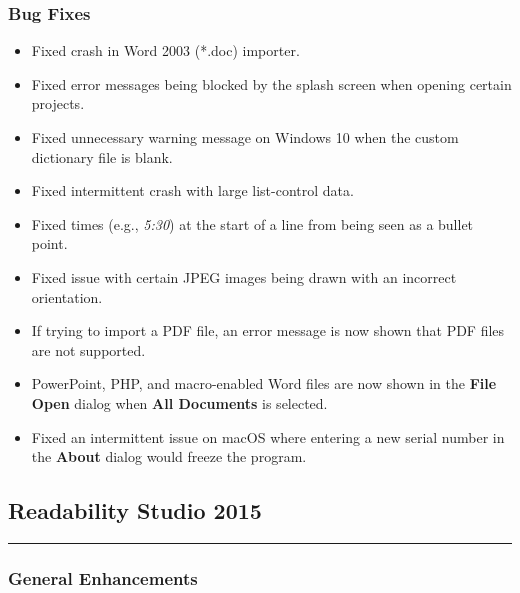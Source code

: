 \documentclass[
]{book}
\providecommand{\tightlist}{%
  \setlength{\itemsep}{0pt}\setlength{\parskip}{0pt}}
\theoremstyle{definition}
\theoremstyle{definition}
\theoremstyle{definition}
\theoremstyle{definition}
\theoremstyle{remark}
\begin{document}
\hypertarget{bug-fixes-1}{%
\subsubsection*{Bug Fixes}\label{bug-fixes-1}}

\begin{itemize}
\tightlist
\item
  Fixed crash in Word 2003 (*.doc) importer.
\item
  Fixed error messages being blocked by the splash screen when opening certain projects.
\item
  Fixed unnecessary warning message on Windows 10 when the custom dictionary file is blank.
\item
  Fixed intermittent crash with large list-control data.
\item
  Fixed times (e.g., \emph{5:30}) at the start of a line from being seen as a bullet point.
\item
  Fixed issue with certain JPEG images being drawn with an incorrect orientation.
\item
  If trying to import a PDF file, an error message is now shown that PDF files are not supported.
\item
  PowerPoint, PHP, and macro-enabled Word files are now shown in the \textbf{File Open} dialog when \textbf{All Documents} is selected.
\item
  Fixed an intermittent issue on macOS where entering a new serial number in the \textbf{About} dialog would freeze the program.
\end{itemize}

\hypertarget{readability-studio-2015}{%
\subsection*{Readability Studio 2015}\label{readability-studio-2015}}

\begin{center}\rule{0.5\linewidth}{0.5pt}\end{center}

\hypertarget{general-enhancements-2}{%
\subsubsection*{General Enhancements}\label{general-enhancements-2}}
\end{document}
